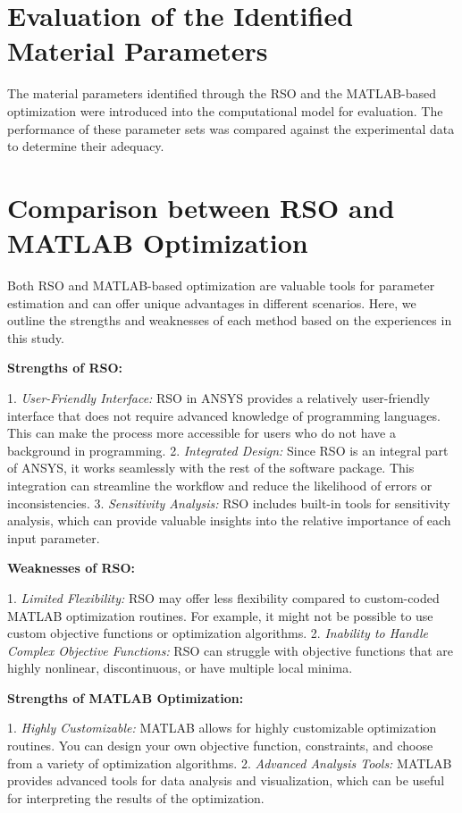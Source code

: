 \section{Evaluation of the Identified Material Parameters}

The material parameters identified through the RSO and the MATLAB-based optimization were introduced into the computational model for evaluation. The performance of these parameter sets was compared against the experimental data to determine their adequacy.


\section{Comparison between RSO and MATLAB Optimization}

Both RSO and MATLAB-based optimization are valuable tools for parameter estimation and can offer unique advantages in different scenarios. Here, we outline the strengths and weaknesses of each method based on the experiences in this study.

\textbf{Strengths of RSO:}

	1. \textit{User-Friendly Interface:} RSO in ANSYS provides a relatively user-friendly interface that does not require advanced knowledge of programming languages. This can make the process more accessible for users who do not have a background in programming.
	2. \textit{Integrated Design:} Since RSO is an integral part of ANSYS, it works seamlessly with the rest of the software package. This integration can streamline the workflow and reduce the likelihood of errors or inconsistencies.
	3. \textit{Sensitivity Analysis:} RSO includes built-in tools for sensitivity analysis, which can provide valuable insights into the relative importance of each input parameter.

\textbf{Weaknesses of RSO:}

	1. \textit{Limited Flexibility:} RSO may offer less flexibility compared to custom-coded MATLAB optimization routines. For example, it might not be possible to use custom objective functions or optimization algorithms.
	2. \textit{Inability to Handle Complex Objective Functions:} RSO can struggle with objective functions that are highly nonlinear, discontinuous, or have multiple local minima.

\textbf{Strengths of MATLAB Optimization:}

	1. \textit{Highly Customizable:} MATLAB allows for highly customizable optimization routines. You can design your own objective function, constraints, and choose from a variety of optimization algorithms.
	2. \textit{Advanced Analysis Tools:} MATLAB provides advanced tools for data analysis and visualization, which can be useful for interpreting the results of the optimization.

